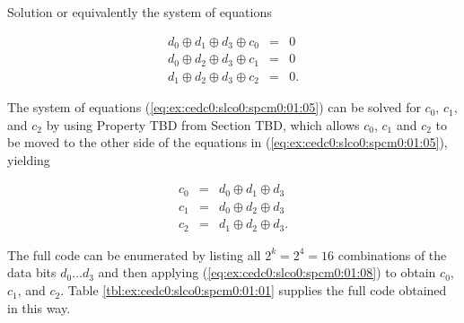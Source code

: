 \begin{vworkexampleparsection}{Solution}
\noindent{}or equivalently the system of equations

\begin{eqnarray}
\nonumber
d_0 \oplus d_1 \oplus d_3 \oplus c_0 & = & 0 \\ 
\label{eq:ex:cedc0:slco0:spcm0:01:05}
d_0 \oplus d_2 \oplus d_3 \oplus c_1 & = & 0 \\ 
\nonumber
d_1 \oplus d_2 \oplus d_3 \oplus c_2 & = & 0 .
\end{eqnarray}

\noindent{}The system of equations (\ref{eq:ex:cedc0:slco0:spcm0:01:05})
can be solved for $c_0$, $c_1$, and $c_2$ by using 
Property TBD 
from
Section TBD, 
which allows $c_0$, $c_1$ and $c_2$ to
be moved to the other side of the equations in (\ref{eq:ex:cedc0:slco0:spcm0:01:05}),
yielding

\begin{eqnarray}
\nonumber
c_0 & = & d_0 \oplus d_1 \oplus d_3          \\ 
\label{eq:ex:cedc0:slco0:spcm0:01:08}
c_1 & = & d_0 \oplus d_2 \oplus d_3          \\ 
\nonumber
c_2  & = & d_1 \oplus d_2 \oplus d_3 .
\end{eqnarray}

The full code can be enumerated by listing all $2^k = 2^4 = 16$ combinations of
the data bits $d_0\ldots{}d_3$ and then applying (\ref{eq:ex:cedc0:slco0:spcm0:01:08})
to obtain $c_0$, $c_1$, and $c_2$.  Table \ref{tbl:ex:cedc0:slco0:spcm0:01:01}
supplies the full code obtained in this way.


\end{vworkexampleparsection}
